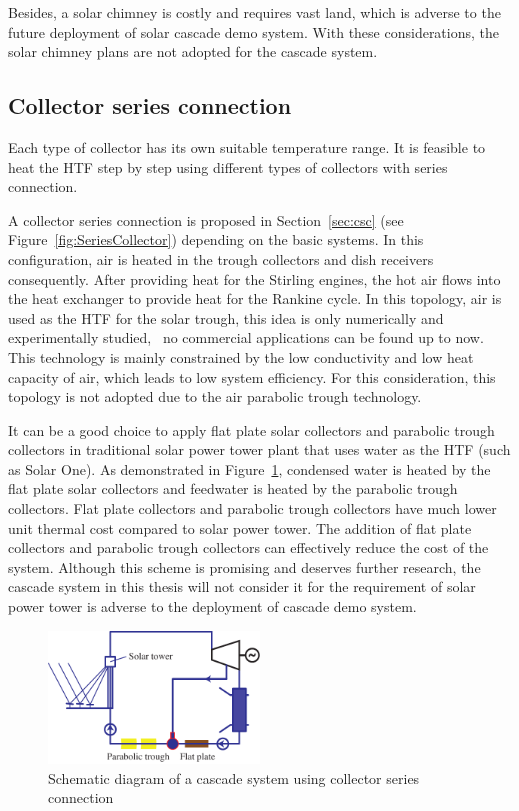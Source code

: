 Besides, a solar chimney is costly and requires vast land, which is adverse to the future deployment of solar cascade demo system. With these considerations, the solar chimney plans are not adopted for the cascade system. 

\subsection{Collector series connection}
Each type of collector has its own suitable temperature range. It is feasible to heat the HTF step by step using different types of collectors with series connection.

A collector series connection is proposed in Section~\ref{sec:csc} (see Figure~\ref{fig:SeriesCollector}) depending on the basic systems. In this configuration, air is heated in the trough collectors and dish receivers consequently. After providing heat for the Stirling engines, the hot air flows into the heat exchanger to provide heat for the Rankine cycle. In this topology, air is used as the HTF for the solar trough, this idea is only numerically and experimentally studied,~\cite{Good2015,Good2016} no commercial applications can be found up to now. This technology is mainly constrained by the low conductivity and low heat capacity of air, which leads to low system efficiency. For this consideration, this topology is not adopted due to the air parabolic trough technology.

It can be a good choice to apply flat plate solar collectors and parabolic trough collectors in traditional solar power tower plant that uses water as the HTF (such as Solar One). As demonstrated in Figure~\ref{fig:seriesCollection}, condensed water is heated by the flat plate solar collectors and feedwater is heated by the parabolic trough collectors. Flat plate collectors and parabolic trough collectors have much lower unit thermal cost compared to solar power tower. The addition of flat plate collectors and parabolic trough collectors can effectively reduce the cost of the system. Although this scheme is promising and deserves further research, the cascade system in this thesis will not consider it for the requirement of solar power tower is adverse to the deployment of cascade demo system.

\begin{figure}[!ht]
\centering 
\includegraphics[width=0.5\textwidth]{fig/SeriesCollection}
\caption{Schematic diagram of a cascade system using collector series connection}\label{fig:seriesCollection}
\end{figure}


